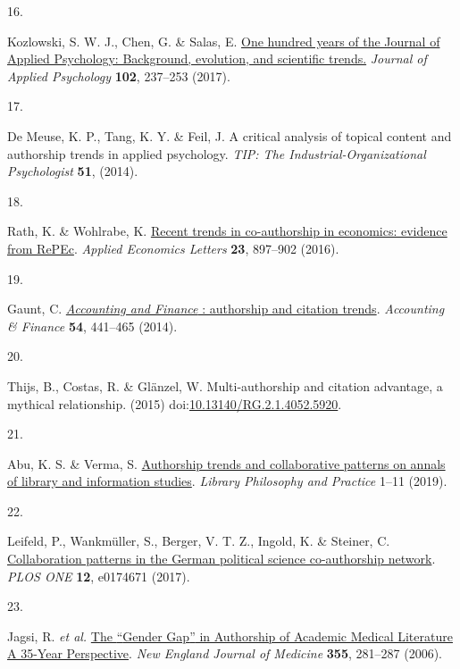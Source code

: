 \documentclass[
  man,floatsintext]{apa6}
\newlength{\cslhangindent}
\newlength{\csllabelwidth}
\newlength{\cslentryspacingunit} %
\newenvironment{CSLReferences}[2] %
 {%
  \setlength{\parindent}{0pt}
  \ifodd #1
  \let\oldpar\par
  \def\par{\hangindent=\cslhangindent\oldpar}
  \fi
  \setlength{\parskip}{#2\cslentryspacingunit}
 }%
 {}
\newcommand{\CSLLeftMargin}[1]{\parbox[t]{\csllabelwidth}{#1}}
\newcommand{\CSLRightInline}[1]{\parbox[t]{\linewidth - \csllabelwidth}{#1}\break}
\begin{document}
\begin{CSLReferences}{0}{0}
\leavevmode{}%
\CSLLeftMargin{16. }%
\CSLRightInline{Kozlowski, S. W. J., Chen, G. \& Salas, E. \href{https://doi.org/10.1037/apl0000192}{One hundred years of the Journal of Applied Psychology: Background, evolution, and scientific trends.} \emph{Journal of Applied Psychology} \textbf{102}, 237--253 (2017).}

\leavevmode{}%
\CSLLeftMargin{17. }%
\CSLRightInline{De Meuse, K. P., Tang, K. Y. \& Feil, J. A critical analysis of topical content and authorship trends in applied psychology. \emph{TIP: The Industrial-Organizational Psychologist} \textbf{51}, (2014).}

\leavevmode{}%
\CSLLeftMargin{18. }%
\CSLRightInline{Rath, K. \& Wohlrabe, K. \href{https://doi.org/10.1080/13504851.2015.1119783}{Recent trends in co-authorship in economics: evidence from RePEc}. \emph{Applied Economics Letters} \textbf{23}, 897--902 (2016).}

\leavevmode{}%
\CSLLeftMargin{19. }%
\CSLRightInline{Gaunt, C. \href{https://doi.org/10.1111/acfi.12061}{{\emph{Accounting and Finance}} : authorship and citation trends}. \emph{Accounting \& Finance} \textbf{54}, 441--465 (2014).}

\leavevmode{}%
\CSLLeftMargin{20. }%
\CSLRightInline{Thijs, B., Costas, R. \& Glänzel, W. Multi-authorship and citation advantage, a mythical relationship. (2015) doi:\href{https://doi.org/10.13140/RG.2.1.4052.5920}{10.13140/RG.2.1.4052.5920}.}

\leavevmode{}%
\CSLLeftMargin{21. }%
\CSLRightInline{Abu, K. S. \& Verma, S. \href{https://au-ezproxy1.avila.edu/login?url=https://www.proquest.com/scholarly-journals/authorship-trends-collaborative-patterns-on/docview/2216882917/se-2}{Authorship trends and collaborative patterns on annals of library and information studies}. \emph{Library Philosophy and Practice} 1--11 (2019).}

\leavevmode{}%
\CSLLeftMargin{22. }%
\CSLRightInline{Leifeld, P., Wankmüller, S., Berger, V. T. Z., Ingold, K. \& Steiner, C. \href{https://doi.org/10.1371/journal.pone.0174671}{Collaboration patterns in the German political science co-authorship network}. \emph{PLOS ONE} \textbf{12}, e0174671 (2017).}

\leavevmode{}%
\CSLLeftMargin{23. }%
\CSLRightInline{Jagsi, R. \emph{et al.} \href{https://doi.org/10.1056/NEJMsa053910}{The {``}Gender Gap{''} in Authorship of Academic Medical Literature {\textemdash} A 35-Year Perspective}. \emph{New England Journal of Medicine} \textbf{355}, 281--287 (2006).}


\end{CSLReferences}
\end{document}
